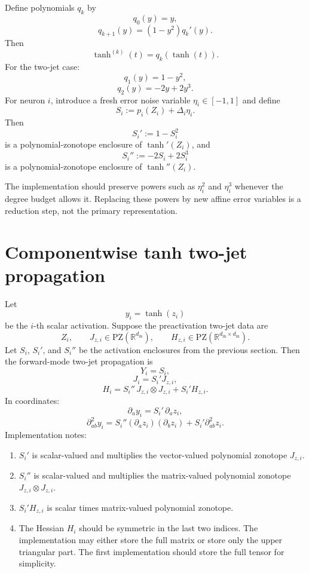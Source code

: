 \documentclass[11pt]{article}
\newcommand{\R}{\mathbb{R}}
\newcommand{\PZ}{\mathrm{PZ}}
\begin{document}
Define polynomials \(q_k\) by
\[
    q_0(y)=y,
\]
\[
    q_{k+1}(y)=(1-y^2)q_k'(y).
\]
Then
\[
    \tanh^{(k)}(t)=q_k(\tanh(t)).
\]
For the two-jet case:
\[
    q_1(y)=1-y^2,
\]
\[
    q_2(y)=-2y+2y^3.
\]
For neuron \(i\), introduce a fresh error noise variable \(\eta_i\in[-1,1]\) and define
\[
    S_i:=p_i(Z_i)+\Delta_i\eta_i.
\]
Then
\[
    S_i' := 1-S_i^2
\]
is a polynomial-zonotope enclosure of \(\tanh'(Z_i)\), and
\[
    S_i'' := -2S_i+2S_i^3
\]
is a polynomial-zonotope enclosure of \(\tanh''(Z_i)\).

The implementation should preserve powers such as \(\eta_i^2\) and \(\eta_i^3\) whenever the degree budget allows it. Replacing these powers by new affine error variables is a reduction step, not the primary representation.

\section{Componentwise tanh two-jet propagation}

Let
\[
    y_i=\tanh(z_i)
\]
be the \(i\)-th scalar activation. Suppose the preactivation two-jet data are
\[
    Z_i,
    \qquad
    J_{z,i}\in\PZ(\R^{d_{\mathrm{in}}}),
    \qquad
    H_{z,i}\in\PZ(\R^{d_{\mathrm{in}}\times d_{\mathrm{in}}}).
\]
Let \(S_i\), \(S_i'\), and \(S_i''\) be the activation enclosures from the previous section. Then the forward-mode two-jet propagation is
\[
    Y_i=S_i,
\]
\[
    J_i=S_i'J_{z,i},
\]
\[
    H_i=S_i''\,J_{z,i}\otimes J_{z,i}+S_i'H_{z,i}.
\]
In coordinates:
\[
    \partial_a y_i
    =
    S_i'\,\partial_a z_i,
\]
\[
    \partial_{ab}^2y_i
    =
    S_i''(\partial_a z_i)(\partial_b z_i)
    +
    S_i'\partial_{ab}^2z_i.
\]
Implementation notes:
\begin{enumerate}[label=(\roman*)]
    \item \(S_i'\) is scalar-valued and multiplies the vector-valued polynomial zonotope \(J_{z,i}\).
    \item \(S_i''\) is scalar-valued and multiplies the matrix-valued polynomial zonotope \(J_{z,i}\otimes J_{z,i}\).
    \item \(S_i'H_{z,i}\) is scalar times matrix-valued polynomial zonotope.
    \item The Hessian \(H_i\) should be symmetric in the last two indices. The implementation may either store the full matrix or store only the upper triangular part. The first implementation should store the full tensor for simplicity.
\end{enumerate}
\end{document}
